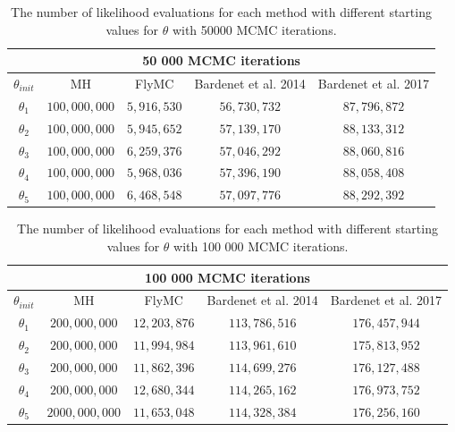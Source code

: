  \begin{table}
    \centering
\begin{tabular}{|c|c|c|c|c|}
  \hline
    \multicolumn{5}{|c|}{50 000 MCMC iterations} \\
    \hline
\hline
        $\theta_{init}$ &  MH & FlyMC & Bardenet et al. 2014 & Bardenet et al. 2017\\ 
         \hline \hline$\theta_1$ & $100,000,000$ & $5,916,530$ & $56,730,732$ & $87,796,872$ \\
        $\theta_2$ & $100,000,000$ & $5,945,652$ & $57,139,170$ & $88,133,312$ \\
        $\theta_3$ & $100,000,000$ & $6,259,376$ & $57,046,292$ & $88,060,816$
        \\ $ \theta_4$ & $100,000,000$ & $5,968,036$ & $57,396,190$ & $88,058,408$ \\
        $\theta_5$ &$100,000,000$&$6,468,548$&$57,097,776$&$88,292,392$
        \\ \hline
\end{tabular}
\caption{The number of likelihood evaluations for each method with different starting values for $\theta$ with 50000 MCMC iterations.}
\label{tab:ll_evals_50k_normal}
\end{table} 

 \begin{table}
    \centering
\begin{tabular}{|c|c|c|c|c|}
  \hline
    \multicolumn{5}{|c|}{100 000 MCMC iterations} \\
    \hline
\hline
        $\theta_{init}$ &  MH & FlyMC & Bardenet et al. 2014 & Bardenet et al. 2017\\ 
         \hline \hline$\theta_1$ & $200,000,000$ & $12,203,876$ & $113,786,516$ & $176,457,944$ \\
        $\theta_2$ & $200,000,000$ & $11,994,984$ & $113,961,610$ & $175,813,952$ \\
        $ \theta_3$ & $200,000,000$ & $11,862,396$ & $114,699,276$ & $176,127,488$ \\
        $\theta_4$ & $200,000,000$ & $12,680,344$ & $114,265,162$ & $176,973,752$ \\
        $\theta_5$ &$2000,000,000$&$11,653,048$&$114,328,384$&$176,256,160$
        \\ \hline
\end{tabular}
\caption{The number of likelihood evaluations for each method with different starting values for $\theta$ with 100 000 MCMC iterations.}
\label{tab:ll_evals_100k_normal}
\end{table} 
